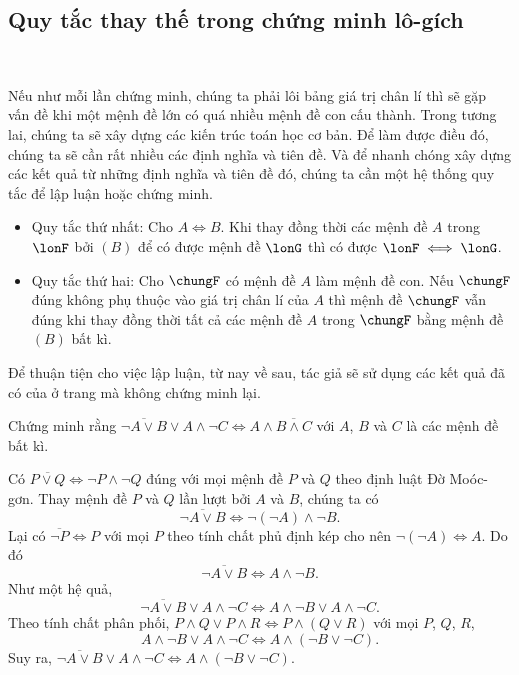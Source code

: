 \subsection{Quy tắc thay thế trong chứng minh lô-gích}

\ %

Nếu như mỗi lần chứng minh, chúng ta phải lôi bảng giá trị chân lí thì sẽ gặp vấn đề khi một mệnh đề lớn có quá nhiều mệnh đề con cấu thành. Trong tương lai, chúng ta sẽ xây dựng các kiến trúc toán học cơ bản. Để làm được điều đó, chúng ta sẽ cần rất nhiều các định nghĩa và tiên đề. Và để nhanh chóng xây dựng các kết quả từ những định nghĩa và tiên đề đó, chúng ta cần một hệ thống quy tắc để lập luận hoặc chứng minh.

\begin{itemize}
   \item
   \textcolor{colorEmphasisCyan}{Quy tắc thứ nhất}: Cho $A \iff B$. Khi thay đồng thời các mệnh đề $A$ trong $\lonF$ bởi $(B)$ để có được mệnh đề $\lonG$ thì có được $\lonF \iff \lonG$.
   \item    
   \textcolor{colorEmphasis}{Quy tắc thứ hai}: Cho $\chungF$ có mệnh đề $A$ làm mệnh đề con. Nếu $\chungF$ đúng không phụ thuộc vào giá trị chân lí của $A$ thì mệnh đề $\chungF$ vẫn đúng khi thay đồng thời tất cả các mệnh đề $A$ trong $\chungF$ bằng mệnh đề $(B)$ bất kì.
\end{itemize}

Để thuận tiện cho việc lập luận, từ nay về sau, tác giả sẽ sử dụng các kết quả đã có của  ở trang \pageref{ex:nen_tang_lo_gich:giai_tich_menh_de:menh_de_phuc_hop:tc_giai_tich_menh_de} mà không chứng minh lại.

\exercise Chứng minh rằng $\overline{\neg A \lor B} \lor A \land \neg C \iff A \land \overline{B \land C}$ với $A$, $B$ và $C$ là các mệnh đề bất kì.

\solution
Có $\overline{P \lor Q} \iff \neg P \land \neg Q$ đúng với mọi mệnh đề $P$ và $Q$ theo định luật Đờ Moóc-gơn. Thay mệnh đề $P$ và $Q$ lần lượt bởi $A$ và $B$, chúng ta có
$$\overline{\neg A \lor B} \iff \neg (\neg A) \land \neg B.$$
Lại có $\overline{\neg P} \iff P$ với mọi $P$ theo tính chất phủ định kép cho nên $\neg(\neg A) \iff A$. Do đó
$$\overline{\neg A \lor B} \iff A \land \neg B.$$
Như một hệ quả,
$$\overline{\neg A \lor B} \lor A \land \neg C \iff A \land \neg B \lor A \land \neg C.$$
Theo tính chất phân phối, $P \land Q \lor P \land R \iff P \land (Q \lor R)$ với mọi $P$, $Q$, $R$,
$$A \land \neg B \lor A \land \neg C \iff A \land (\neg B \lor \neg C).$$
Suy ra, $\overline{\neg A \lor B} \lor A \land \neg C \iff A \land (\neg B \lor \neg C)$.

